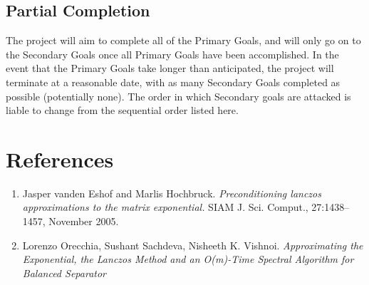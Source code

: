 \documentclass[a4paper, fleqn]{article}
\begin{document}
\subsection*{Partial Completion}%
\label{sub:partial_completion}

The project will aim to complete all of the Primary Goals, and will only go on to the Secondary Goals once all Primary Goals have been accomplished. In the event that the Primary Goals take longer than anticipated, the project will terminate at a reasonable date, with as many Secondary Goals completed as possible (potentially none). The order in which Secondary goals are attacked is liable to change from the sequential order listed here.

\section*{References}%
\label{sec:references}
\begin{enumerate}
        \item Jasper vanden Eshof and Marlis Hochbruck. \textit{Preconditioning lanczos approximations to the matrix exponential.} SIAM J. Sci. Comput., 27:1438–1457, November 2005.
        \item Lorenzo Orecchia, Sushant Sachdeva, Nisheeth K. Vishnoi. \textit{Approximating the Exponential, the Lanczos Method and an O(m)-Time Spectral Algorithm for Balanced Separator}
\end{enumerate}
\end{document}
